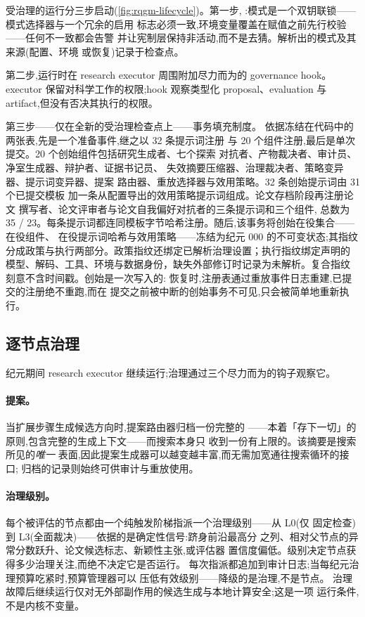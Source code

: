 受治理的运行分三步启动(\cref{fig:rqgm-lifecycle})。第一步,
:模式是一个双钥联锁——模式选择器与一个冗余的启用
标志必须一致,环境变量覆盖在赋值之前先行校验——任何不一致都会告警
并让宪制层保持非活动,而不是去猜。解析出的模式及其来源(配置、环境
或恢复)记录于检查点。

第二步,运行时在 research executor 周围附加尽力而为的 governance hook。
executor 保留对科学工作的权限;hook 观察类型化 proposal、evaluation 与
artifact,但没有否决其执行的权限。

第三步——仅在全新的受治理检查点上——事务填充制度。
依据冻结在代码中的两张表,先是一个准备事件,继之以 32 条提示词注册
与 20 个组件注册,最后是单次提交。20 个创始组件包括研究生成者、七个探索
对抗者、产物裁决者、审计员、净室生成器、辩护者、证据书记员、
失效摘要压缩器、治理裁决者、策略变异器、提示词变异器、提案
路由器、重放选择器与效用策略。32 条创始提示词由 31 个已提交模板
加一条从配置导出的效用策略提示词组成。论文存档阶段再注册论文
撰写者、论文评审者与论文自我偏好对抗者的三条提示词和三个组件,
总数为 35 / 23。每条提示词都连同模板字节哈希注册。随后,该事务将创始在役集合——在役组件、
在役提示词哈希与效用策略——冻结为纪元 000 的不可变状态;其指纹
分成政策与执行两部分。政策指纹还绑定已解析治理设置；执行指纹绑定声明的
模型、解码、工具、环境与数据身份，缺失外部修订时记录为未解析。复合指纹
刻意不含时间戳。创始是一次写入的:
恢复时,注册表通过重放事件日志重建,已提交的注册绝不重跑,而在
提交之前被中断的创始事务不可见,只会被简单地重新执行。

\subsection{逐节点治理}\label{sec:rqgm:node}

纪元期间 research executor 继续运行;治理通过三个尽力而为的钩子观察它。

\paragraph{提案。}
当扩展步骤生成候选方向时,提案路由器归档一份完整的
——本着「存下一切」的原则,包含完整的生成上下文——而搜索本身只
收到一份有上限的。该摘要是搜索所见的\emph{唯一}
表面,因此提案生成器可以越变越丰富,而无需加宽通往搜索循环的接口;
归档的记录则始终可供审计与重放使用。

\paragraph{治理级别。}
每个被评估的节点都由一个纯触发阶梯指派一个治理级别——从 L0(仅
固定检查)到 L3(全面裁决)——依据的是确定性信号:跻身前沿最高分
之列、相对父节点的异常分数跃升、论文候选标志、新颖性主张,或评估器
置信度偏低。级别决定节点获得多少治理关注,而绝不决定它是否运行。
每次指派都追加到审计日志;当每纪元治理预算吃紧时,预算管理器可以
压低有效级别——降级的是治理,不是节点。
治理故障后继续运行仅对无外部副作用的候选生成与本地计算安全;这是一项
运行条件,不是内核不变量。

